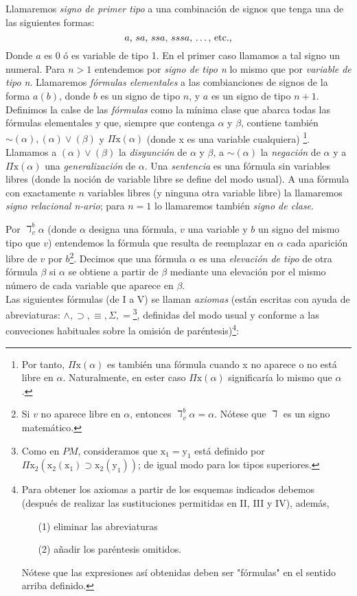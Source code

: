 Llamaremos \textit{signo de primer tipo} a una combinación de signos que tenga una de las siguientes formas:
\begin{equation}
    a,\thinspace sa,\thinspace ssa,\thinspace sssa,\thinspace \dots,\thinspace \text{etc.,}
\end{equation}
Donde $a$ es $0$ ó es variable de tipo 1. En el primer caso llamamos a tal signo un numeral. Para $n>1$ entendemos por \textit{signo de tipo n} lo mismo que por 
\textit{variable de tipo n}. Llamaremos \textit{fórmulas elementales} a las combianciones de signos de la forma $a(b)$, donde $b$ es un signo de tipo $n$, y $a$ 
es un signo de tipo $n+1$. Definimos la calse de las \textit{fórmulas} como la mínima clase que abarca todas las fórmulas elementales y que, siempre que contenga 
$\alpha$ y $\beta$, contiene también $\sim(\alpha), (\alpha)\vee (\beta)$ y $\Pi\text{x}(\alpha)$ (donde x es una variable cualquiera)
\footnote{Por tanto, $\Pi\text{x}(\alpha)$ es también una fórmula cuando x no aparece o no está libre en $\alpha$. Naturalmente, en ester caso $\Pi\text{x}(\alpha)$
significaría lo mismo que $\alpha$.}. Llamamos a $(\alpha)\vee (\beta)$ la \textit{disyunción} de $\alpha$ y $\beta$, a $\sim(\alpha)$ la \textit{negación} de $\alpha$
y a $\Pi\text{x}(\alpha)$ una \textit{generalización} de $\alpha$. Una \textit{sentencia} es una fórmula sin variables libres (donde la noción de variable libre se 
define del modo usual). A una fórmula con exactamente $n$ variables libres (y ninguna otra variable libre) la llamaremos \textit{signo relacional n-ario}; para $n=1$
lo llamaremos también \textit{signo de clase}.

Por $\daleth^b_v \alpha$ (donde $\alpha$ designa una fórmula, $v$ una variable y $b$ un signo del mismo tipo que $v$) entendemos la fórmula que resulta de reemplazar 
en $\alpha$ cada aparición libre de $v$ por $b$\footnote{Si $v$ no aparece libre en $\alpha$, entonces $\daleth^b_v \alpha = \alpha$. Nótese que $\daleth$ es un signo 
matemático.}. Decimos que una fórmula $\alpha$ es una \textit{elevación de tipo} de otra fórmula $\beta$ si $\alpha$ se obtiene a partir de $\beta$ mediante una elevación
por el mismo número de cada variable que aparece en $\beta$. \\

Las siguientes fórmulas (de I a V) se llaman \textit{axiomas} (están escritas con ayuda de abreviaturas: $\wedge, \supset, \equiv, \Sigma, =$\footnote{Como en $PM$, 
consideramos que $\text{x}_1 = \text{y}_1$ está definido por $\Pi \text{x}_2 (\text{x}_2(\text{x}_1) \supset \text{x}_2(\text{y}_1))$; de igual modo para los tipos 
superiores.}, definidas del modo usual y conforme a las conveciones habituales sobre la omisión de paréntesis)\footnote{Para obtener los axiomas a partir de los esquemas
indicados debemos (después de realizar las sustituciones permitidas en II, III y IV), además,
\begin{enumerate}
    \item[(1)] eliminar las abreviaturas
    \item[(2)] añadir los paréntesis omitidos.
\end{enumerate} 
Nótese que las expresiones así obtenidas deben ser "fórmulas" en el sentido arriba definido.}:

